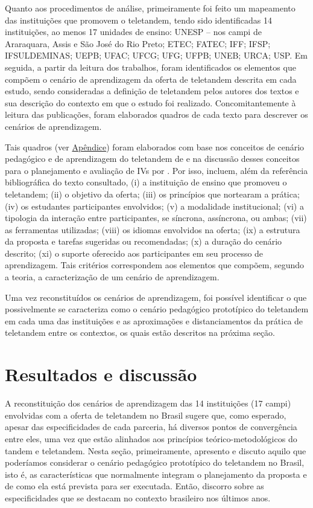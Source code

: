 \documentclass[portuguese]{textolivre}
\begin{document}
Quanto aos procedimentos de análise, primeiramente foi feito um mapeamento das instituições que promovem o teletandem, tendo sido identificadas 14 instituições, ao menos 17 unidades de ensino: UNESP -- nos campi de Araraquara, Assis e São José do Rio Preto; ETEC; FATEC; IFF; IFSP; IFSULDEMINAS; UEPB; UFAC; UFCG; UFG; UFPB; UNEB; URCA; USP. Em seguida, a partir da leitura dos trabalhos, foram identificados os elementos que compõem o cenário de aprendizagem da oferta de teletandem descrita em cada estudo, sendo consideradas a definição de teletandem pelos autores dos textos e sua descrição do contexto em que o estudo foi realizado. Concomitantemente à leitura das publicações, foram elaborados quadros de cada texto para descrever os cenários de aprendizagem.

Tais quadros (ver \hyperref[apendice]{Apêndice}) foram elaborados com base nos conceitos de cenário pedagógico e de aprendizagem do teletandem de \textcite{aranha2017} e na discussão desses conceitos para o planejamento e avaliação de IVs por \textcite{rampazzamoore2024b}. Por isso, incluem, além da referência bibliográfica do texto consultado, (i) a instituição de ensino que promoveu o teletandem; (ii) o objetivo da oferta; (iii) os princípios que nortearam a prática; (iv) os estudantes participantes envolvidos; (v) a modalidade institucional; (vi) a tipologia da interação entre participantes, se síncrona, assíncrona, ou ambas; (vii) as ferramentas utilizadas; (viii) os idiomas envolvidos na oferta; (ix) a estrutura da proposta e tarefas sugeridas ou recomendadas; (x) a duração do cenário descrito; (xi) o suporte oferecido aos participantes em seu processo de aprendizagem. Tais critérios correspondem aos elementos que compõem, segundo a teoria, a caracterização de um cenário de aprendizagem.

Uma vez reconstituídos os cenários de aprendizagem, foi possível identificar o que possivelmente se caracteriza como o cenário pedagógico prototípico do teletandem em cada uma das instituições e as aproximações e distanciamentos da prática de teletandem entre os contextos, os quais estão descritos na próxima seção.


\section{Resultados e discussão}\label{resultados}

A reconstituição dos cenários de aprendizagem das 14 instituições (17 campi) envolvidas com a oferta de teletandem no Brasil sugere que, como esperado, apesar das especificidades de cada parceria, há diversos pontos de convergência entre eles, uma vez que estão alinhados aos princípios teórico-metodológicos do tandem e teletandem. Nesta seção, primeiramente, apresento e discuto aquilo que poderíamos considerar o cenário pedagógico prototípico do teletandem no Brasil, isto é, as características que normalmente integram o planejamento da proposta e de como ela está prevista para ser executada. Então, discorro sobre as especificidades que se destacam no contexto brasileiro nos últimos anos.
\end{document}
